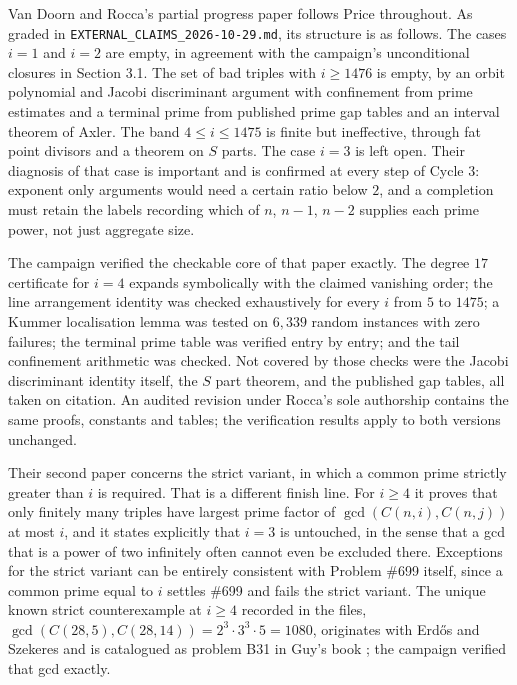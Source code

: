 \documentclass[11pt]{article}
\theoremstyle{remark}
\begin{document}
Van Doorn and Rocca's partial progress paper \cite{VDRpartial} follows Price throughout. As graded in \texttt{EXTERNAL\_CLAIMS\_2026-10-29.md}, its structure is as follows. The cases $i=1$ and $i=2$ are empty, in agreement with the campaign's unconditional closures in Section 3.1. The set of bad triples with $i\ge 1476$ is empty, by an orbit polynomial and Jacobi discriminant argument with confinement from prime estimates and a terminal prime from published prime gap tables and an interval theorem of Axler. The band $4\le i\le 1475$ is finite but ineffective, through fat point divisors and a theorem on $S$ parts. The case $i=3$ is left open. Their diagnosis of that case is important and is confirmed at every step of Cycle 3: exponent only arguments would need a certain ratio below $2$, and a completion must retain the labels recording which of $n$, $n-1$, $n-2$ supplies each prime power, not just aggregate size.

The campaign verified the checkable core of that paper exactly. The degree $17$ certificate for $i=4$ expands symbolically with the claimed vanishing order; the line arrangement identity was checked exhaustively for every $i$ from $5$ to $1475$; a Kummer localisation lemma was tested on $6{,}339$ random instances with zero failures; the terminal prime table was verified entry by entry; and the tail confinement arithmetic was checked. Not covered by those checks were the Jacobi discriminant identity itself, the $S$ part theorem, and the published gap tables, all taken on citation. An audited revision under Rocca's sole authorship contains the same proofs, constants and tables; the verification results apply to both versions unchanged.

Their second paper \cite{VDRstrict} concerns the strict variant, in which a common prime strictly greater than $i$ is required. That is a different finish line. For $i\ge 4$ it proves that only finitely many triples have largest prime factor of $\gcd(C(n,i),C(n,j))$ at most $i$, and it states explicitly that $i=3$ is untouched, in the sense that a gcd that is a power of two infinitely often cannot even be excluded there. Exceptions for the strict variant can be entirely consistent with Problem \#699 itself, since a common prime equal to $i$ settles \#699 and fails the strict variant. The unique known strict counterexample at $i\ge 4$ recorded in the files, $\gcd(C(28,5),C(28,14))=2^3\cdot 3^3\cdot 5=1080$, originates with Erd\H{o}s and Szekeres and is catalogued as problem B31 in Guy's book \cite{Guy}; the campaign verified that gcd exactly.
\end{document}
